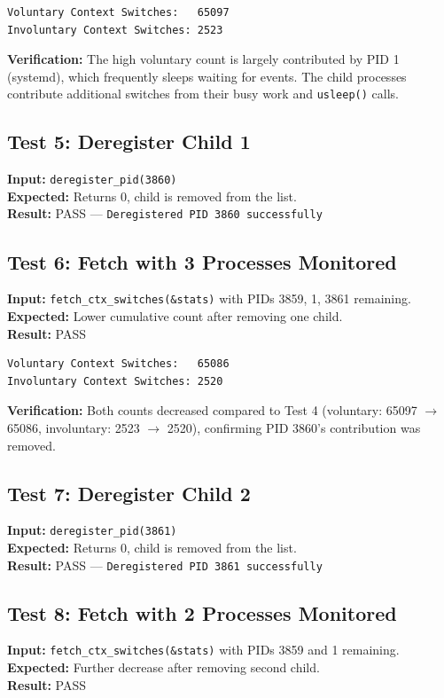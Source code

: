 \documentclass[12pt,a4paper]{article}
\begin{document}
\begin{lstlisting}
Voluntary Context Switches:   65097
Involuntary Context Switches: 2523
\end{lstlisting}

\textbf{Verification:} The high voluntary count is largely contributed by PID 1 (systemd), which frequently sleeps waiting for events. The child processes contribute additional switches from their busy work and \texttt{usleep()} calls.

\subsection*{Test 5: Deregister Child 1}
\textbf{Input:} \texttt{deregister\_pid(3860)} \\
\textbf{Expected:} Returns 0, child is removed from the list. \\
\textbf{Result:} PASS --- \texttt{Deregistered PID 3860 successfully}

\subsection*{Test 6: Fetch with 3 Processes Monitored}
\textbf{Input:} \texttt{fetch\_ctx\_switches(\&stats)} with PIDs 3859, 1, 3861 remaining. \\
\textbf{Expected:} Lower cumulative count after removing one child. \\
\textbf{Result:} PASS

\begin{lstlisting}
Voluntary Context Switches:   65086
Involuntary Context Switches: 2520
\end{lstlisting}

\textbf{Verification:} Both counts decreased compared to Test 4 (voluntary: 65097 $\rightarrow$ 65086, involuntary: 2523 $\rightarrow$ 2520), confirming PID 3860's contribution was removed.

\subsection*{Test 7: Deregister Child 2}
\textbf{Input:} \texttt{deregister\_pid(3861)} \\
\textbf{Expected:} Returns 0, child is removed from the list. \\
\textbf{Result:} PASS --- \texttt{Deregistered PID 3861 successfully}

\subsection*{Test 8: Fetch with 2 Processes Monitored}
\textbf{Input:} \texttt{fetch\_ctx\_switches(\&stats)} with PIDs 3859 and 1 remaining. \\
\textbf{Expected:} Further decrease after removing second child. \\
\textbf{Result:} PASS
\end{document}

